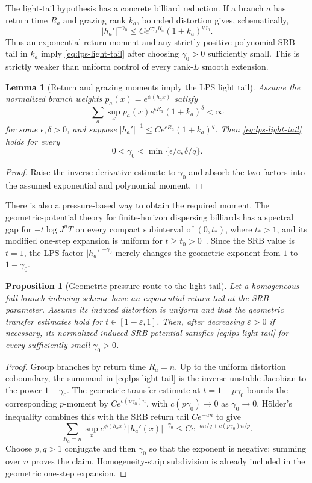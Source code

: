 \documentclass[11pt]{article}
\newtheorem{proposition}[theorem]{Proposition}
\newtheorem{lemma}[theorem]{Lemma}
\begin{document}
The light-tail hypothesis has a concrete billiard reduction.  If a branch
$a$ has return time $R_a$ and grazing rank $k_a$, bounded distortion gives,
schematically,
\[
 |h_a'|^{-\gamma_0}\le
 C e^{c\gamma_0R_a}(1+k_a)^{q\gamma_0}.
\]
Thus an exponential return moment and any strictly positive polynomial SRB
tail in $k_a$ imply \eqref{eq:lps-light-tail} after choosing
$\gamma_0>0$ sufficiently small.  This is strictly weaker than uniform
control of every rank-$L$ smooth extension.

\begin{lemma}[Return and grazing moments imply the LPS light tail]
\label{lem:billiard-light-tail}
Assume the normalized branch weights $p_a(x)=e^{\phi(h_ax)}$ satisfy
\[
 \sum_a\sup_x p_a(x)e^{\epsilon R_a}(1+k_a)^\delta<\infty
\]
for some $\epsilon,\delta>0$, and suppose
$|h_a'|^{-1}\le Ce^{cR_a}(1+k_a)^q$.
Then \eqref{eq:lps-light-tail} holds for every
\[
 0<\gamma_0<\min\{\epsilon/c,\delta/q\}.
\]
\end{lemma}

\begin{proof}
Raise the inverse-derivative estimate to $\gamma_0$ and absorb the two
factors into the assumed exponential and polynomial moment.
\end{proof}

There is also a pressure-based way to obtain the required moment.  The
geometric-potential theory for finite-horizon dispersing billiards has a
spectral gap for $-t\log J^uT$ on every compact subinterval of
$(0,t_*)$, where $t_*>1$, and its modified one-step expansion is uniform for
$t\ge t_0>0$~\cite{DLreview}.  Since the SRB value is $t=1$, the LPS factor
$|h_a'|^{-\gamma_0}$ merely changes the geometric exponent from $1$ to
$1-\gamma_0$.

\begin{proposition}[Geometric-pressure route to the light tail]
\label{prop:pressure-light-tail}
Let a homogeneous full-branch inducing scheme have an exponential return
tail at the SRB parameter.  Assume its induced distortion is uniform and
that the geometric transfer estimates hold for
$t\in[1-\varepsilon,1]$.  Then, after decreasing
$\varepsilon>0$ if necessary, its normalized induced SRB potential satisfies
\eqref{eq:lps-light-tail} for every sufficiently small
$\gamma_0>0$.
\end{proposition}

\begin{proof}
Group branches by return time $R_a=n$.  Up to the uniform distortion
coboundary, the summand in \eqref{eq:lps-light-tail} is the inverse unstable
Jacobian to the power $1-\gamma_0$.  The geometric transfer estimate at
$t=1-p\gamma_0$ bounds the corresponding $p$-moment by
$Ce^{c(p\gamma_0)n}$, with $c(p\gamma_0)\to0$ as
$\gamma_0\to0$.  H\"older's inequality combines this with the SRB return
tail $Ce^{-an}$ to give
\[
 \sum_{R_a=n}\sup_x
 e^{\phi(h_ax)}|h_a'(x)|^{-\gamma_0}
 \le C e^{-a n/q+c(p\gamma_0)n/p}.
\]
Choose $p,q>1$ conjugate and then $\gamma_0$ so that the exponent is
negative; summing over $n$ proves the claim.  Homogeneity-strip subdivision
is already included in the geometric one-step expansion.
\end{proof}
\end{document}
